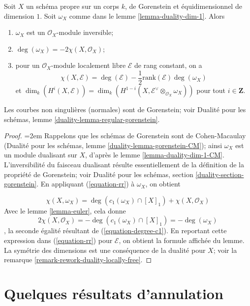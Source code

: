 \begin{lemma} \label{lemma-rr} Soit $X$ un schéma propre sur un corps $k$, de Gorenstein et équidimensionnel de dimension $1$. Soit $\omega_X$ comme dans le lemme \ref{lemma-duality-dim-1}. Alors \begin{enumerate} \item $\omega_X$ est un $\mathcal{O}_X$-module inversible; \item $\deg(\omega_X) = -2\chi(X, \mathcal{O}_X)$; \item pour un $\mathcal{O}_X$-module localement libre $\mathcal{E}$ de rang constant, on a $$
\chi(X, \mathcal{E}) = \deg(\mathcal{E}) -
\textstyle{\frac{1}{2}} \text{rank}(\mathcal{E}) \deg(\omega_X)
$$ et $\dim_k(H^i(X, \mathcal{E})) =
\dim_k(H^{1 - i}(X, \mathcal{E}^\vee \otimes_{\mathcal{O}_X} \omega_X))$ pour tout $i \in \mathbf{Z}$.
\end{enumerate}
\end{lemma}

\noindent
Les courbes non singulières (normales) sont de Gorenstein; voir Dualité pour les schémas, lemme \ref{duality-lemma-regular-gorenstein}.

\begin{proof}
{\emergencystretch=2em
Rappelons que les schémas de Gorenstein sont de Cohen-Macaulay (Dualité pour les schémas, lemme \ref{duality-lemma-gorenstein-CM}); ainsi $\omega_X$ est un module dualisant sur $X$, d'après le lemme \ref{lemma-duality-dim-1-CM}. L'inversibilité du faisceau dualisant résulte essentiellement de la définition de la propriété de Gorenstein; voir Dualité pour les schémas, section \ref{duality-section-gorenstein}. En appliquant (\ref{equation-rr}) à $\omega_X$, on obtient
\par}
$$
\chi(X, \omega_X) = 
\deg(c_1(\omega_X) \cap [X]_1) + \chi(X, \mathcal{O}_X)
$$ Avec le lemme \ref{lemma-euler}, cela donne $$
2\chi(X, \mathcal{O}_X) = - \deg(c_1(\omega_X) \cap [X]_1) = - \deg(\omega_X)
$$, la seconde égalité résultant de (\ref{equation-degree-c1}). En reportant cette expression dans (\ref{equation-rr}) pour $\mathcal{E}$, on obtient la formule affichée du lemme. La symétrie des dimensions est une conséquence de la dualité pour $X$; voir la remarque \ref{remark-rework-duality-locally-free}.
\end{proof}





\section{Quelques résultats d'annulation}
\label{section-vanishing}

